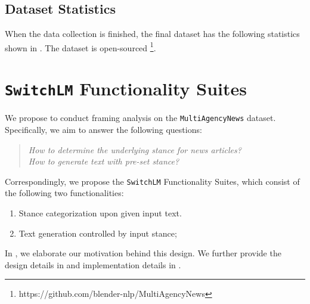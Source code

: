 \subsection{Dataset Statistics}
\label{dataset-stats}
When the data collection is finished, the final dataset has the following statistics shown in . The dataset is open-sourced \footnote{https://github.com/blender-nlp/MultiAgencyNews}.
\begin{table}[h]
    \centering
    \caption{The Statistics of the Collected Dataset}
    \label{tab:dataset-stat}
\end{table}


\section{\texttt{SwitchLM} Functionality Suites}
\label{switchlm}
We propose to conduct framing analysis on the \texttt{MultiAgencyNews} dataset. Specifically, we aim to answer the following questions:
\begin{quote}
    \textit{How to determine the underlying stance for news articles?} \\
    \textit{How to generate text with pre-set stance?}
\end{quote}
Correspondingly, we propose the \texttt{SwitchLM} Functionality Suites, which consist of the following two functionalities:
\begin{enumerate}
    \item Stance categorization upon given input text.
    \item Text generation controlled by input stance;
\end{enumerate}
In , we elaborate our motivation behind this design. We further provide the design details in  and implementation details in .

